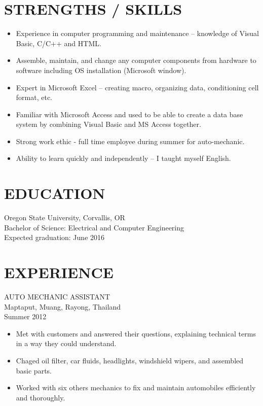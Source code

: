 \documentclass[11pt]{res} %
\begin{document}
\begin{resume}
                                               
\section{STRENGTHS / SKILLS}
\begin {itemize}
\item Experience in computer programming and maintenance -- knowledge of Visual Basic, C/C++ and HTML.
\item Assemble, maintain, and change any computer components from hardware to software including OS installation (Microsoft window).
\item Expert in Microsoft Excel -- creating macro, organizing data, conditioning cell format, etc.
\item Familiar with Microsoft Access and used to be able to create a data base system by combining Visual Basic and MS Access together.
\item Strong work ethic - full time employee during summer for auto-mechanic.
\item Ability to learn quickly and independently -- I taught myself English.
\end{itemize}

 
\section{EDUCATION} 
 \noindent Oregon State University, Corvallis, OR\\
Bachelor of Science: Electrical and Computer Engineering\\
Expected graduation: June 2016\\

 
\section{EXPERIENCE} 
 AUTO MECHANIC ASSISTANT \\
Maptaput, Muang, Rayong, Thailand \\
Summer 2012
\vspace{0.2in}
   \begin{itemize} \itemsep -2pt  %
   \item Met with customers and answered their questions, explaining technical terms in a way they could understand. 
   \item Chaged oil filter, car fluids, headlights, windshield wipers, and assembled basic parts.
  \item  Worked with six others mechanics to fix and maintain automobiles efficiently and thoroughly.
 \end{itemize}


\end{resume}
\end{document}
